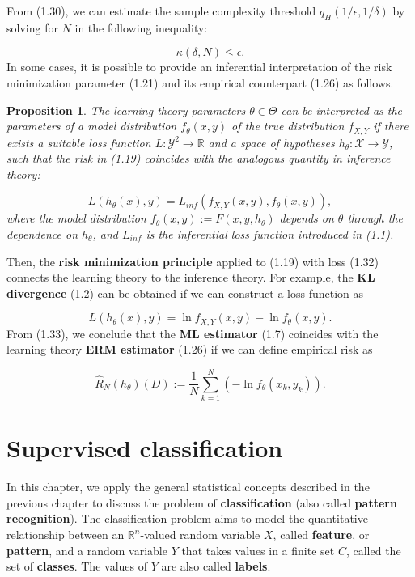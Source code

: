 \documentclass{report}
\newtheorem{proposition}{Proposition}[chapter]
\begin{document}
From (1.30), we can estimate the sample complexity threshold $q_H(1/\epsilon, 1/\delta)$ by solving for $N$ in the following inequality:

\begin{equation}
\kappa(\delta,N) \leq \epsilon.
\end{equation}
In some cases, it is possible to provide an inferential interpretation of the risk minimization parameter (1.21) and its empirical counterpart (1.26) as follows.

\begin{proposition}
The learning theory parameters $\theta \in \Theta$ can be interpreted as the parameters of a model distribution $f_\theta(x,y)$ of the true distribution $f_{X,Y}$ if there exists a suitable loss function $L : \mathcal{Y}^2 \to \mathbb{R}$ and a space of hypotheses $h_\theta: \mathcal{X} \to \mathcal{Y}$, such that the risk in (1.19) coincides with the analogous quantity in inference theory:

\begin{equation}
L(h_\theta(x), y) = L_{inf}(f_{X,Y}(x,y),f_\theta(x,y)),
\end{equation}
where the model distribution $f_\theta(x,y) := F(x,y,h_\theta)$ depends on $\theta$ through the dependence on $h_\theta$, and $L_{inf}$ is the inferential loss function introduced in (1.1).
\end{proposition}
Then, the \textbf{risk minimization principle} applied to (1.19) with loss (1.32) connects the learning theory to the inference theory. For example, the \textbf{KL divergence} (1.2) can be obtained if we can construct a loss function as

\begin{equation}
L(h_\theta(x), y) = \ln f_{X,Y}(x,y) -\ln f_\theta(x,y).
\end{equation}
From (1.33), we conclude that the \textbf{ML estimator} (1.7) coincides with the learning theory \textbf{ERM estimator} (1.26) if we can define empirical risk as

\begin{equation}
\hat{R}_N(h_\theta)(D) := \frac{1}{N}\sum_{k=1}^N (-\ln f_\theta(x_k,y_k)).
\end{equation}

\chapter{Supervised classification}
In this chapter, we apply the general statistical concepts described in the previous chapter to discuss the problem of \textbf{classification} (also called \textbf{pattern recognition}). The classification problem aims to model the quantitative relationship between an $\mathbb{R}^n$-valued random variable $X$, called \textbf{feature}, or \textbf{pattern}, and a random variable $Y$ that takes values in a finite set $C$, called the set of \textbf{classes}. The values of $Y$ are also called \textbf{labels}.
\end{document}

